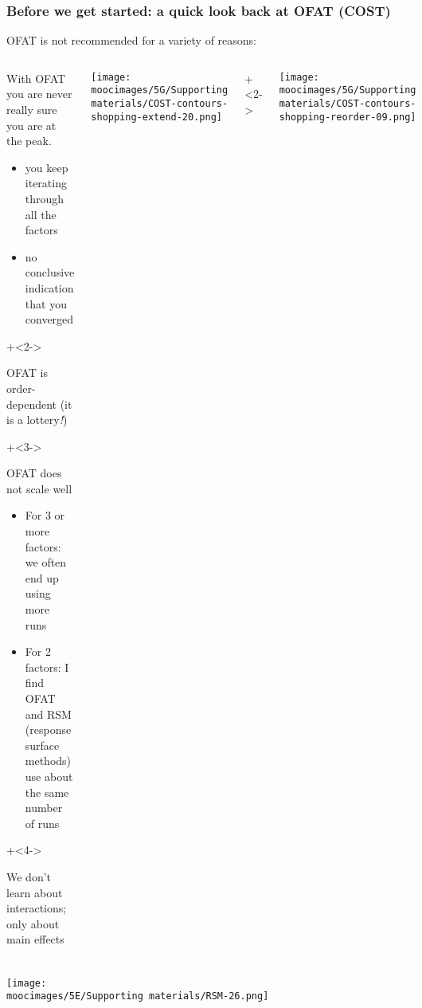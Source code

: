 \documentclass[handout,11pt,aspectratio=169,mathserif]{beamer}
\begin{document}
\begin{frame}\frametitle{Before we get started: a quick look back at OFAT (COST)}
	
	OFAT is not recommended for a variety of reasons:
	\begin{columns}[T]
			\vspace{0.5cm}
			\begin{itemize}
				\item	With OFAT you are never really sure you are at the peak.
					\begin{itemize}
						\item	you keep iterating through all the factors
						\item	no conclusive indication that you converged
					\end{itemize}
				
		\onslide+<2->{
				\vspace{0.5cm}
				\item	OFAT is order-dependent (it is a lottery\emph{!})
		}
		\onslide+<3->{
				\vspace{0.5cm}
		
				\item	OFAT does not scale well 
					\begin{itemize}
						\item	For 3 or more factors: we often end up using more runs
						\item	For 2 factors: I find OFAT and RSM (response surface methods) use about the same number of
								runs
					\end{itemize}
		}
		\onslide+<4->{
				\vspace{0.5cm}
		
				\item	We don't learn about interactions; only about  main effects 
		}
			\end{itemize}
		
			\centerline{\texttt{[image: \\moocimages/5G/Supporting materials/COST-contours-shopping-extend-20.png]}}
			\onslide+<2->{
				\centerline{\texttt{[image: \\moocimages/5G/Supporting materials/COST-contours-shopping-reorder-09.png]}}
			}

	\end{columns}
	
	

\end{frame}
\begin{frame}\frametitle{}
	\centerline{\texttt{[image: \\moocimages/5E/Supporting materials/RSM-26.png]}}
\end{frame}
\end{document}
